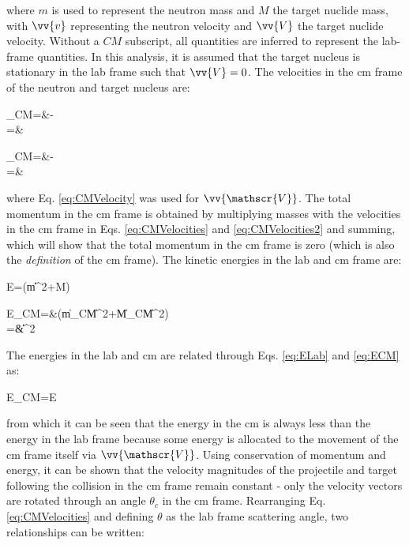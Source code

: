 \beq
\label{eq:CMVelocity}
\equiv{}
\eeq

where \(m\) is used to represent the neutron mass and \(M\) the target nuclide mass, with \(\vv{v}\) representing the neutron velocity and \(\vv{V}\) the target nuclide velocity. Without a \(CM\) subscript, all quantities are inferred to represent the lab-frame quantities. In this analysis, it is assumed that the target nucleus is stationary in the lab frame such that \(\vv{V}=0\). The velocities in the \gls{cm} frame of the neutron and target nucleus are:

\beqa
\label{eq:CMVelocities}
_{CM}=&-\\
=&
\eeqa

\beqa
\label{eq:CMVelocities2}
_{CM}=&-\\
=&
\eeqa

where Eq. \eqref{eq:CMVelocity} was used for \(\vv{\mathscr{V}}\). The total momentum in the \gls{cm} frame is obtained by multiplying masses with the velocities in the \gls{cm} frame in Eqs. \eqref{eq:CMVelocities} and \eqref{eq:CMVelocities2} and summing, which will show that the total momentum in the \gls{cm} frame is zero (which is also the {\it definition} of the \gls{cm} frame). The kinetic energies in the lab and \gls{cm} frame are:

\beq
\label{eq:ELab}
E=\left(m\|\|^2+M\right)
\eeq

\beqa
\label{eq:ECM}
E_{CM}=&\left(m\|_{CM}\|^2+M\|_{CM}\|^2\right)\\
=&\|\|^2
\eeqa

The energies in the lab and \gls{cm} are related through Eqs. \eqref{eq:ELab} and \eqref{eq:ECM} as:

\beq
E_{CM}=E
\eeq

from which it can be seen that the energy in the \gls{cm} is always less than the energy in the lab frame because some energy is allocated to the movement of the \gls{cm} frame itself via \(\vv{\mathscr{V}}\). Using conservation of momentum and energy, it can be shown that the velocity magnitudes of the projectile and target following the collision in the \gls{cm} frame remain constant - only the velocity vectors are rotated through an angle \(\theta_c\) in the \gls{cm} frame. Rearranging Eq. \eqref{eq:CMVelocities} and defining \(\theta\) as the lab frame scattering angle, two relationships can be written:

